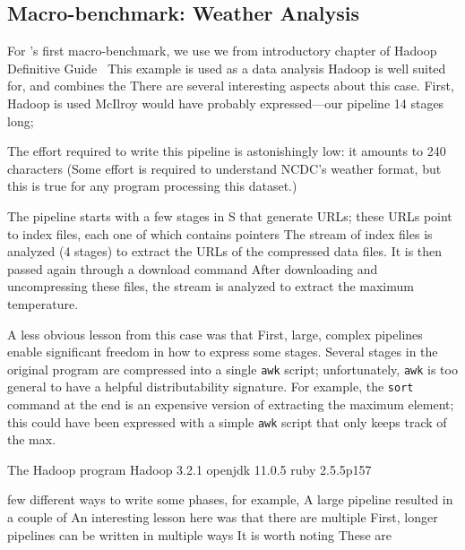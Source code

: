 \documentclass[sigplan,10pt,review,anonymous]{acmart}
\newcommand{\ttt}[1]{\texttt{\small #1}}
\newcommand{\cn}[1]{\mbox{\textcircled{\footnotesize #1}}}
\newcommand{\sta}{\cn{\textsc{S}}\xspace}
\begin{document}
\subsection{Macro-benchmark: Weather Analysis}
\label{macro1}

For \sys's first macro-benchmark, we use we
from introductory chapter of Hadoop Definitive Guide~\cite[Chapter 2]{hadoop:15}
This example is used as a data analysis Hadoop is well suited for, and combines the 
There are several interesting aspects about this case.
First, Hadoop is used 
McIlroy would have probably expressed---our pipeline 
14 stages long;

The effort required to write this pipeline is astonishingly low:
  it amounts to 240 characters 
(Some effort is required to understand NCDC's weather format, but this is true for any program processing this dataset.)

The pipeline starts with a few stages in \sta  that generate URLs;
  these URLs point to index files, each one of which contains pointers 
The stream of index files is analyzed (4 stages) to extract the URLs of the compressed data files.
It is then passed again through a download command
After downloading and uncompressing these files, the stream is analyzed to extract the maximum temperature.

A less obvious lesson from this case was that  
First, large, complex pipelines enable significant freedom in how to express some stages.
Several stages in the original program are compressed into a single \ttt{awk} script;
  unfortunately, \ttt{awk} is too general to have a helpful distributability signature.
For example, the \ttt{sort} command at the end is an expensive version of extracting the maximum element;
  this could have been expressed with a simple \ttt{awk} script that only keeps track of the max.

The Hadoop program 
Hadoop 3.2.1
openjdk 11.0.5
ruby 2.5.5p157

few different ways to write some phases, 
  for example, 
A large pipeline resulted in a couple of 
An interesting lesson here was that there are multiple
First, longer pipelines can be written in multiple ways
It is worth noting
These are


\end{document}
